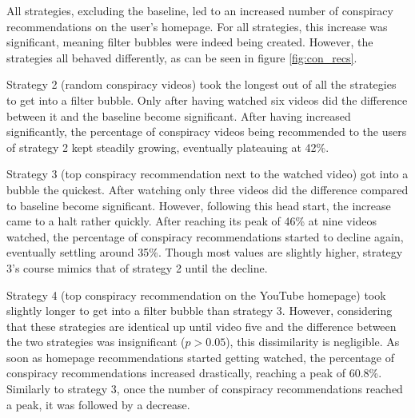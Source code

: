\documentclass[../main.tex]{subfiles}
\begin{document}

All strategies, excluding the baseline, led to an increased number of conspiracy recommendations on the 
user's homepage. For all strategies, this increase was significant, meaning filter bubbles were indeed being 
created. However, the strategies all behaved differently, as can be seen in figure \ref{fig:con_recs}. 

Strategy 2 (random conspiracy videos) took the longest out of all the strategies to get into a filter bubble. 
Only after having watched six videos did the difference between it and the baseline become significant. After 
having increased significantly, the percentage of conspiracy videos being recommended to the users of strategy 2
kept steadily growing, eventually plateauing at 42\%. 

Strategy 3 (top conspiracy recommendation next to the watched video) got into a bubble the quickest. After 
watching only three videos did the difference compared to baseline become significant. However, following this 
head start, the increase came to a halt rather quickly. After reaching its peak of 46\% at nine videos watched, 
the percentage of conspiracy recommendations started to decline again, eventually settling around 35\%. Though 
most values are slightly higher, strategy 3's course mimics that of strategy 2 until the decline. 

Strategy 4 (top conspiracy recommendation on the YouTube homepage) took slightly longer to get into a filter 
bubble than strategy 3. However, considering that these strategies are identical up until video five and the 
difference between the two strategies was insignificant ($p > 0.05$), this dissimilarity is negligible. As soon 
as homepage recommendations started getting watched, the percentage of conspiracy recommendations increased 
drastically, reaching a peak of 60.8\%. Similarly to strategy 3, once the number of conspiracy recommendations 
reached a peak, it was followed by a decrease. 
\end{document}
